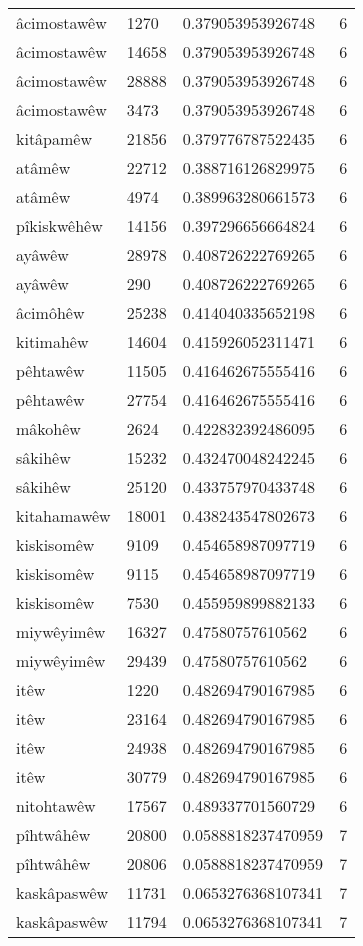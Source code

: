 \begin{longtable}{llll}
âcimostawêw & 1270 & 0.379053953926748 & 6\\
âcimostawêw & 14658 & 0.379053953926748 & 6\\
âcimostawêw & 28888 & 0.379053953926748 & 6\\
âcimostawêw & 3473 & 0.379053953926748 & 6\\
kitâpamêw & 21856 & 0.379776787522435 & 6\\
atâmêw & 22712 & 0.388716126829975 & 6\\
atâmêw & 4974 & 0.389963280661573 & 6\\
pîkiskwêhêw & 14156 & 0.397296656664824 & 6\\
ayâwêw & 28978 & 0.408726222769265 & 6\\
ayâwêw & 290 & 0.408726222769265 & 6\\
âcimôhêw & 25238 & 0.414040335652198 & 6\\
kitimahêw & 14604 & 0.415926052311471 & 6\\
pêhtawêw & 11505 & 0.416462675555416 & 6\\
pêhtawêw & 27754 & 0.416462675555416 & 6\\
mâkohêw & 2624 & 0.422832392486095 & 6\\
sâkihêw & 15232 & 0.432470048242245 & 6\\
sâkihêw & 25120 & 0.433757970433748 & 6\\
kitahamawêw & 18001 & 0.438243547802673 & 6\\
kiskisomêw & 9109 & 0.454658987097719 & 6\\
kiskisomêw & 9115 & 0.454658987097719 & 6\\
kiskisomêw & 7530 & 0.455959899882133 & 6\\
miywêyimêw & 16327 & 0.47580757610562 & 6\\
miywêyimêw & 29439 & 0.47580757610562 & 6\\
itêw & 1220 & 0.482694790167985 & 6\\
itêw & 23164 & 0.482694790167985 & 6\\
itêw & 24938 & 0.482694790167985 & 6\\
itêw & 30779 & 0.482694790167985 & 6\\
nitohtawêw & 17567 & 0.489337701560729 & 6\\
pîhtwâhêw & 20800 & 0.0588818237470959 & 7\\
pîhtwâhêw & 20806 & 0.0588818237470959 & 7\\
kaskâpaswêw & 11731 & 0.0653276368107341 & 7\\
kaskâpaswêw & 11794 & 0.0653276368107341 & 7\\

\end{longtable}
